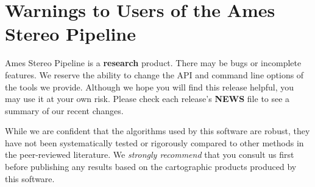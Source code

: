 \section{Warnings to Users of the Ames Stereo Pipeline}

Ames Stereo Pipeline is a {\bf research} product. There may be bugs or
incomplete features. We reserve the ability to change the API and
command line options of the tools we provide. Although we hope you will
find this release helpful, you may use it at your own risk. Please check
each release's {\bf NEWS} file to see a summary of our recent changes.

While we are confident that the algorithms used by this software are
robust, they have not been systematically tested or rigorously
compared to other methods in the peer-reviewed literature. We {\it
strongly recommend} that you consult us first before publishing
any results based on the cartographic products produced by this software.
